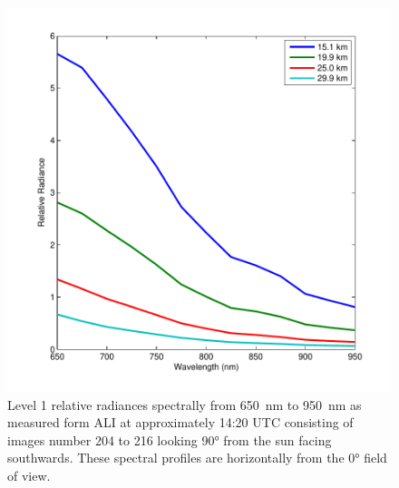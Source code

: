 \documentclass[12pt]{article}
\begin{document}
\begin{figure}
\includegraphics[width=1.0\textwidth]{./Images/AliSpectralRadiances.pdf}
    \caption{Level 1 relative radiances spectrally from 650~nm to 950~nm as measured form ALI at approximately 14:20 UTC consisting of images number 204 to 216 looking 90\si{\degree} from the sun facing southwards. These spectral profiles are horizontally from the 0\si{\degree} field of view.  }
    \label{fig:AliSpectralRadiances}
\end{figure}

\newpage
\end{document}
